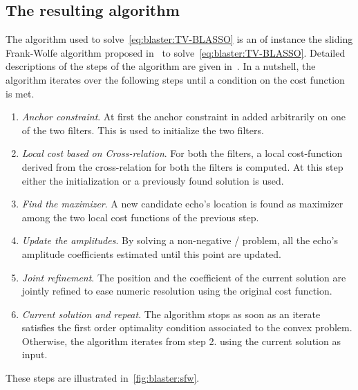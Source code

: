 \subsection{The resulting algorithm}
The algorithm used to solve~\cref{eq:blaster:TV-BLASSO} is an of instance the sliding Frank-Wolfe algorithm proposed in~ to solve~\cref{eq:blaster:TV-BLASSO}.
Detailed descriptions of the steps of the algorithm are given in~.
In a nutshell, the algorithm iterates over the following steps until a condition on the cost function is met.
\begin{enumerate}
    \item \textit{Anchor constraint}.
    At first the anchor constraint in added arbitrarily on one of the two filters. This is used to initialize the two filters.
    \item \textit{\textit{Local} cost based on Cross-relation}.
    For both the filters, a local cost-function derived from the cross-relation for both the filters is computed.
    At this step either the initialization or a previously found solution is used.
    \item \textit{Find the maximizer}.
    A new candidate echo's location is found as maximizer among the two local cost functions of the previous step.
    \item \textit{Update the amplitudes}.
    By solving a non-negative \LASSO/ problem, all the echo's amplitude coefficients estimated until this point are updated.
    \item \textit{Joint refinement}.
    The position and the coefficient of the current solution are jointly refined to ease numeric resolution using the original cost function.
    \item \textit{Current solution and repeat}.
    The algorithm stops as soon as an iterate satisfies the first order optimality condition associated to the convex problem.
    Otherwise, the algorithm iterates from step 2. using the current solution as input.
\end{enumerate}
These steps are illustrated in~\cref{fig:blaster:sfw}.

